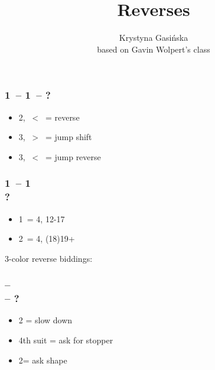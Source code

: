 \documentclass[12pt, a4paper]{article}
\title{Reverses}
\author{Krystyna Gasińska\\\small{based on Gavin Wolpert's class}}
\begin{document}
\maketitle


\subsubsection*{1\ -- 1\ -- ?}
\begin{itemize}
    \item 2, \ < \ = reverse
    \item 3, \ > \ = jump shift
    \item 3, \ < \ = jump reverse
\end{itemize}

\subsubsection*{1\mins\ -- 1\hearts\ \\
                ?}
\begin{itemize}
    \item 1\spades\ = 4\spades, 12-17
    \item 2\spades\ = 4\spades, (18)19+
\end{itemize}

3-color reverse biddings:

\subsubsection*{ --  \\  -- ?}
\begin{itemize}
    \item 2 = slow down
    \item 4th suit = ask for stopper \gf
    \item 2\nt = ask shape \gf
\end{itemize}

\end{document}
